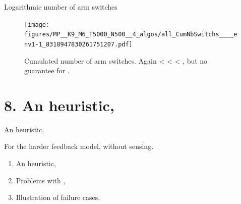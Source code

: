 \documentclass[12pt,english,ignorenonframetext,aspectratio=169,]{beamer}
\providecommand{\tightlist}{%
  \setlength{\itemsep}{0pt}\setlength{\parskip}{0pt}}
\begin{document}
\begin{frame}[plain]{Logarithmic number of arm switches}

\begin{figure}[h!]
\centering
\texttt{[image: figures/MP\_\_K9\_M6\_T5000\_N500\_\_4\_algos/all\_CumNbSwitchs\_\_\_\_env1-1\_8318947830261751207.pdf]}
\caption{\footnotesize{Cumulated number of arm switches. Again \textcolor{blue}{\rhoRand{}} < \textcolor{red}{\RandTopM{}} < \textcolor{bluegreen}{\Selfish{}} < \textcolor{yellowgreen}{\MCTopM{}}, but no guarantee for \textcolor{blue}{\rhoRand{}}.}}
\end{figure}

\end{frame}








\section{\hfill{}8. An heuristic, \Selfish\hfill{}}

\begin{frame}{An heuristic, \Selfish}

For the harder feedback model, without sensing.

\begin{enumerate}
\def\labelenumi{\arabic{enumi}.}
\tightlist
\item
  An heuristic,\vspace*{15pt}
\item
  Problems with \Selfish,\vspace*{15pt}
\item
  Illustration of failure cases.
\end{enumerate}

\end{frame}
\end{document}

